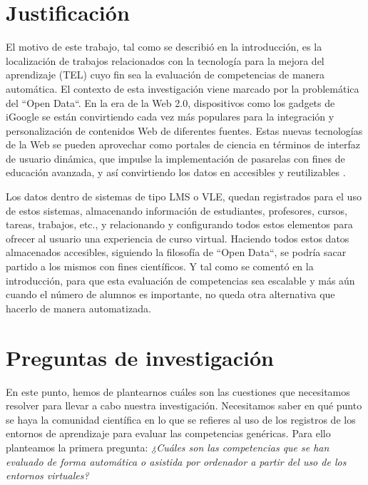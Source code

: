 \section{Justificación}
El motivo de este trabajo, tal como se describió en la introducción, es la localización de trabajos relacionados con la tecnología para la mejora del aprendizaje (TEL) cuyo fin sea la evaluación de competencias de manera automática. El contexto de esta investigación viene marcado por la problemática del ``Open Data``. En la era de la Web 2.0, dispositivos como los gadgets de iGoogle se están convirtiendo cada vez más populares para la integración y personalización de contenidos Web de diferentes fuentes. Estas nuevas tecnologías de la Web se pueden aprovechar como portales de ciencia en términos de interfaz de usuario dinámica, que impulse la implementación de pasarelas con fines de educación avanzada, y así convirtiendo los datos en accesibles y reutilizables \cite{Wenjun:2008}.

Los datos dentro de sistemas de tipo LMS o VLE, quedan registrados para el uso de estos sistemas, almacenando información de estudiantes, profesores, cursos, tareas, trabajos, etc., y relacionando y configurando todos estos elementos para ofrecer al usuario una experiencia de curso virtual. Haciendo todos estos datos almacenados accesibles, siguiendo la filosofía de ``Open Data``, se podría sacar partido a los mismos con fines científicos. Y tal como se comentó en la introducción, para que esta evaluación de competencias sea escalable y más aún cuando el número de alumnos es importante, no queda otra alternativa que hacerlo de manera automatizada.


\section{Preguntas de investigación}

En este punto, hemos de plantearnos cuáles son las cuestiones que necesitamos resolver para llevar a cabo nuestra investigación. Necesitamos saber en qué punto se haya la comunidad científica en lo que se refieres al uso de los registros de los entornos de aprendizaje para evaluar las competencias genéricas. Para ello planteamos la primera pregunta: \emph{¿Cuáles son las competencias que se han evaluado de forma automática o asistida por ordenador a partir del uso de los entornos virtuales?}

